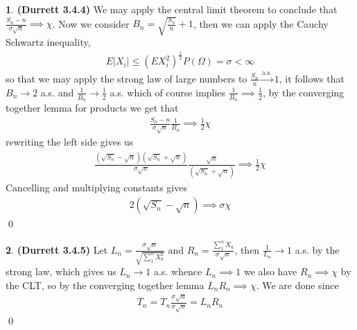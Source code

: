 \documentclass{article}
\theoremstyle{definition}
\newtheorem{pb}{}
\newcommand{\abs}[1]{\left\vert#1\right\vert}
\newcommand{\tand}{\text{ and }}
\begin{document}
    \begin{pb}\textbf{(Durrett 3.4.4)}
        We may apply the central limit theorem to conclude that \(\frac{S_n - n}{\sigma\sqrt{n}} \implies \chi\). Now we consider \(B_n = \sqrt{\frac{S_n}{n}} + 1\), then we can apply the Cauchy Schwartz inequality,
        \begin{align*}
            E\abs{X_i} \leq \left(EX_i^2\right)^{\frac12}P(\Omega) = \sigma < \infty
        \end{align*}
        so that we may apply the strong law of large numbers to \(\frac{S_n}{n} \overset{\text{a.s.}}{\longrightarrow} 1\), it follows that \(B_n \to 2\) a.s. and \(\frac{1}{B_n} \to \frac12\) a.s. which of course implies \(\frac{1}{B_n} \implies \frac12\), by the converging together lemma for products we get that
        \begin{align*}
            \frac{S_n - n}{\sigma\sqrt{n}}\frac{1}{B_n} \implies \frac{1}{2}\chi
        \end{align*}
        rewriting the left side gives us
        \begin{align*}
            \frac{(\sqrt{S_n}-\sqrt{n})(\sqrt{S_n}+\sqrt{n})}{\sigma\sqrt{n}}\frac{\sqrt{n}}{(\sqrt{S_n}+\sqrt{n})} \implies \frac12 \chi
        \end{align*}
        Cancelling and multiplying constants gives
        \begin{align*}
            2(\sqrt{S_n}-\sqrt{n}) \implies \sigma \chi
        \end{align*} \qed
    \end{pb}
    \begin{pb} \textbf{(Durrett 3.4.5)}
        Let \(L_n = \frac{\sigma\sqrt{n}}{\sqrt{\sum_1^n X_k^2}} \tand R_n = \frac{\sum_1^n X_k}{\sigma\sqrt{n}}\), then \(\frac{1}{L_n} \to 1\) a.s. by the strong law, which gives us \(L_n \to 1\) a.s. whence \(L_n \implies 1\) we also have \(R_n \implies \chi\) by the CLT, so by the converging together lemma \(L_n R_n \implies \chi\). We are done since
        \begin{align*}
            T_n = T_n \frac{\sigma\sqrt{n}}{\sigma\sqrt{n}} = L_nR_n
        \end{align*} \qed
    \end{pb}
\end{document}
